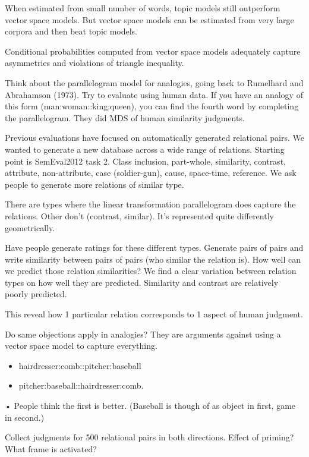 When estimated from small number of words, topic models still outperform vector space models. But vector space models can be estimated from very large corpora and then beat topic models.

Conditional probabilities computed from vector space models adequately capture asymmetries and violations of triangle inequality.

Think about  the parallelogram model for analogies, going back to Rumelhard and Abrahamson (1973). Try to evaluate using human data.
If you have an analogy of this form (man:woman::king:queen), you can find the fourth word by completing the parallelogram. They did MDS of human similarity judgments. %

Previous evaluations have focused on automatically generated relational pairs. We wanted to generate a new database across a wide range of relations. Starting point is SemEval2012 task 2.
Class inclusion, part-whole, similarity, contrast, attribute, non-attribute, case (soldier-gun), cause, space-time, reference. We ask people to generate more relations of similar type.

There are types where the linear transformation parallelogram does capture the relations. Other don't (contrast, similar). It's represented quite differently geometrically. 

Have people generate ratings for these different types. Generate pairs of pairs and write similarity between pairs of pairs (who similar the relation is). How well can we predict those relation similarities? We find a clear variation between relation types on how well they are predicted. Similarity and contrast are relatively poorly predicted.

This reveal how 1 particular relation corresponds to 1 aspect of human judgment. %

Do same objections apply in analogies? They are arguments against using a vector space model to capture everything.
\begin{itemize}
\item
hairdresser:comb::pitcher:baseball
\item
pitcher:baseball::hairdresser:comb.
\end{itemize}•
People think the first is better. (Baseball is though of as object in first, game in second.)

Collect judgments for 500 relational pairs in both directions. Effect of priming? What frame is activated?

